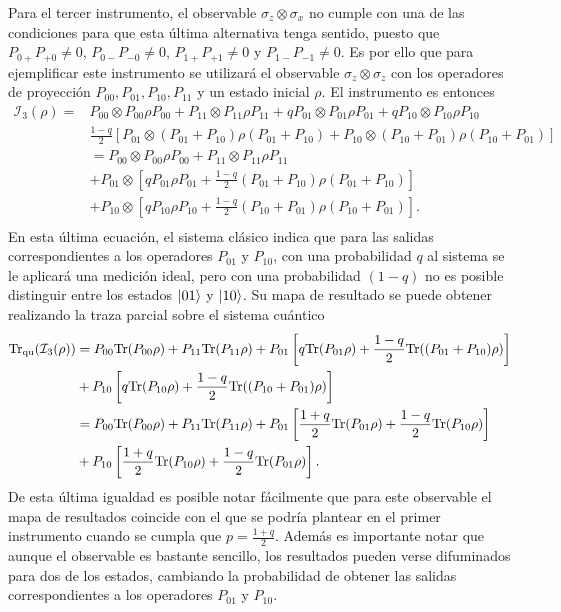 Para el tercer instrumento, el observable $\sigma_z\otimes \sigma_x$ no cumple
con una de las condiciones para que esta última alternativa tenga sentido,
puesto que $P_{0+}P_{+0}\ne 0$,  $P_{0-}P_{-0}\ne 0$, $P_{1+}P_{+1}\ne 0$ y
$P_{1-}P_{-1}\ne 0$. Es por ello que para ejemplificar este instrumento se
utilizará el observable $\sigma_z\otimes \sigma_z$ con los operadores de
proyección $P_{00},P_{01},P_{10},P_{11}$ y un estado inicial $\rho$. El
instrumento es entonces 
\[\begin{split}\mathcal{I}_3(\rho)=&P_{00}\otimes P_{00}\rho P_{00}+P_{11}\otimes P_{11}\rho P_{11}+q P_{01}\otimes P_{01}\rho P_{01}+q P_{10}\otimes P_{10}\rho P_{10}\\
&\frac{1-q}{2}\left[P_{01}\otimes (P_{01}+P_{10})\rho(P_{01}+P_{10})+ P_{10}\otimes(P_{10}+P_{01})\rho (P_{10}+P_{01}) \right]\\
&=P_{00}\otimes P_{00}\rho P_{00}+P_{11}\otimes P_{11}\rho P_{11}\\
&+P_{01}\otimes \left[q P_{01}\rho P_{01}+\frac{1-q}{2}(P_{01}+P_{10})\rho(P_{01}+P_{10})\right]\\
&+P_{10}\otimes \left[q P_{10}\rho P_{10}+\frac{1-q}{2}(P_{10}+P_{01})\rho (P_{10}+P_{01}) \right].\\
 \end{split}\] 
En esta última ecuación, el sistema clásico indica que para las salidas correspondientes a los operadores $ P_{01}$ y $P_{10}$, con una probabilidad $q$ al sistema se le aplicará una medición ideal, pero con una probabilidad $(1-q)$ no es posible distinguir entre los estados $|01\rangle$ y $|10\rangle$. Su mapa de resultado se puede obtener realizando la traza parcial sobre el sistema cuántico \[\begin{split}{\rm Tr}_{\text{qu}}(\mathcal{I}_3(\rho)) &=P_{00} {\rm Tr}(P_{00}\rho)+P_{11}{\rm Tr}(P_{11}\rho)+P_{01}\left[q {\rm Tr}(P_{01}\rho)+\frac{1-q}{2}{\rm Tr}((P_{01}+P_{10})\rho)\right]\\
    &+P_{10} \left[q {\rm Tr}(P_{10}\rho)+\frac{1-q}{2}{\rm Tr}((P_{10}+P_{01})\rho)\right]\\
    &=P_{00} {\rm Tr}(P_{00}\rho)+P_{11}{\rm Tr}(P_{11}\rho)+P_{01}\left[\frac{1+q}{2} {\rm Tr}(P_{01}\rho)+\frac{1-q}{2}{\rm Tr}(P_{10}\rho)\right]\\
    &+P_{10} \left[\frac{1+q}{2} {\rm Tr}(P_{10}\rho)+\frac{1-q}{2}{\rm Tr}(P_{01}\rho)\right].\\
\end{split}\] 
De esta última igualdad es posible notar fácilmente que para este observable el
mapa de resultados coincide con el que se podría plantear en el primer
instrumento cuando se cumpla que $p=\frac{1+q}{2}$. Además es importante notar
que aunque el observable es bastante sencillo, los resultados pueden verse
difuminados para dos de los estados, cambiando la probabilidad de obtener las
salidas correspondientes a los operadores $P_{01}$ y $P_{10}$.


